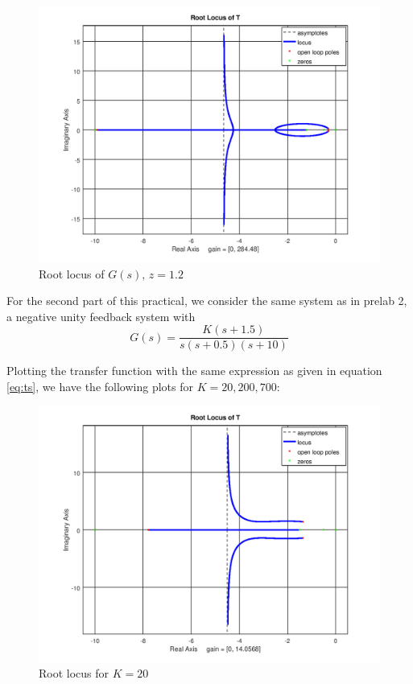\documentclass[12pt, a4paper]{article}
\begin{document}
		\begin{figure}[H]
			\centering
			\includegraphics[width=.8\textwidth]{img/rlocus_3.png}
			\caption{Root locus of $G(s),\,z=1.2$}
			\label{fig:fig_3}
		\end{figure}

		For the second part of this practical, we consider the same system as in prelab 2, a negative unity feedback system with
		\begin{equation}
			G(s) = \frac{K(s+1.5)}{s(s+0.5)(s+10)}
			\label{eq:lab_2}
		\end{equation}

		Plotting the transfer function with the same expression as given in equation \eqref{eq:ts}, we have the following plots for $K=20, 200, 700$:
		\begin{figure}[H]
			\centering
			\includegraphics[width=.8\textwidth]{img/rlocus_20.png}
			\caption{Root locus for $K = 20$}
			\label{fig:rlocus_20}
		\end{figure}
\end{document}
